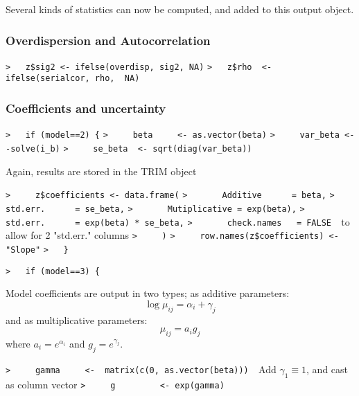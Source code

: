 \documentclass[a4paper]{article}
\begin{document}
Several kinds of statistics can now be computed, and added to this output object.\par



\subsubsection{Overdispersion and Autocorrelation}\par

\verb~>   z$sig2 <- ifelse(overdisp, sig2, NA)~\newline
\verb~>   z$rho  <- ifelse(serialcor, rho,  NA)~\par



\subsubsection{Coefficients and uncertainty}\par

\verb~>   if (model==2) {~\newline
\verb~>     beta     <- as.vector(beta)~\newline
\verb~>     var_beta <- -solve(i_b)~\newline
\verb~>     se_beta  <- sqrt(diag(var_beta))~\par

Again, results are stored in the TRIM object\par
\verb~>     z$coefficients <- data.frame(~\newline
\verb~>       Additive      = beta,~\newline
\verb~>       std.err.      = se_beta,~\newline
\verb~>       Mutiplicative = exp(beta),~\newline
\verb~>       std.err.      = exp(beta) * se_beta,~\newline
\verb~>       check.names   = FALSE  ~{\sffamily to allow for 2 "std.err." columns}\newline
\verb~>     )~\newline
\verb~>     row.names(z$coefficients) <- "Slope"~\newline
\verb~>   }~\par

\verb~>   if (model==3) {~\par
Model coefficients are output in two types; as additive parameters:
$$ \log\mu_{ij} = \alpha_i + \gamma_j $$
and as multiplicative parameters:
$$ \mu_{ij} = a_i g_j $$
where $a_i=e^{\alpha_i}$ and $g_j = e^{\gamma_j}$.\par
\verb~>     gamma     <-  matrix(c(0, as.vector(beta)))  ~{\sffamily Add $\gamma_1\equiv1$, and cast as column vector}\newline
\verb~>     g         <- exp(gamma)~\par
\end{document}
